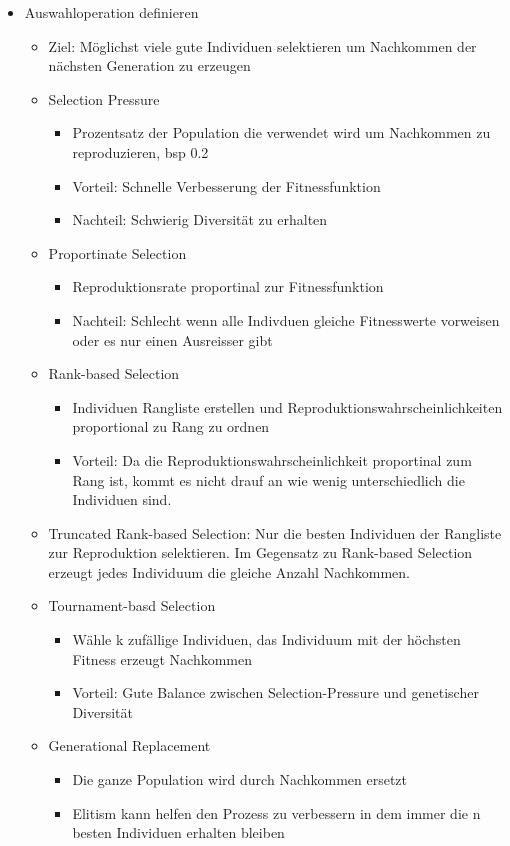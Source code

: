 \begin{itemize}
      \item Auswahloperation definieren
        \begin{itemize}
          \item Ziel: Möglichst viele gute Individuen selektieren um Nachkommen der nächsten Generation zu erzeugen
          \item Selection Pressure
            \begin{itemize}
              \item Prozentsatz der Population die verwendet wird um Nachkommen zu reproduzieren, bsp 0.2
              \item Vorteil: Schnelle Verbesserung der Fitnessfunktion
              \item Nachteil: Schwierig Diversität zu erhalten
            \end{itemize}
          \item Proportinate Selection
            \begin{itemize}
              \item Reproduktionsrate proportinal zur Fitnessfunktion
              \item Nachteil: Schlecht wenn alle Indivduen gleiche Fitnesswerte vorweisen oder es nur einen Ausreisser gibt
            \end{itemize}
          \item Rank-based Selection
            \begin{itemize}
              \item Individuen Rangliste erstellen und Reproduktionswahrscheinlichkeiten proportional zu Rang zu ordnen
              \item Vorteil: Da die Reproduktionswahrscheinlichkeit proportinal zum Rang ist, kommt es nicht drauf an wie wenig unterschiedlich die Individuen sind.
            \end{itemize}
          \item Truncated Rank-based Selection: Nur die besten Individuen der Rangliste zur Reproduktion selektieren. Im Gegensatz zu Rank-based Selection erzeugt jedes Individuum die gleiche Anzahl Nachkommen.
          \item Tournament-basd Selection
            \begin{itemize}
              \item Wähle k zufällige Individuen, das Individuum mit der höchsten Fitness erzeugt Nachkommen
              \item Vorteil: Gute Balance zwischen Selection-Pressure und genetischer Diversität
            \end{itemize}
          \item Generational Replacement
            \begin{itemize}
              \item Die ganze Population wird durch Nachkommen ersetzt
              \item Elitism kann helfen den Prozess zu verbessern in dem immer die n besten Individuen erhalten bleiben
            \end{itemize}



\end{itemize}
\end{itemize}
